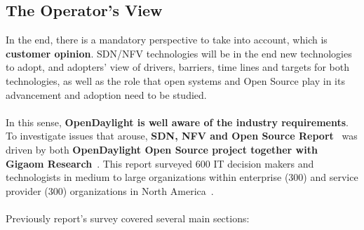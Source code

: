 \documentclass[a4paper, 12pt]{book}
\begin{document}
\subsection{The Operator's View}
In the end, there is a mandatory perspective to take into account, which is \textbf{customer opinion}. SDN/NFV technologies will be in the end new technologies to adopt, and adopters' view of drivers, barriers, time lines and targets for both technologies, as well as the role that open systems and Open Source play in its advancement and adoption need to be studied.\\
\\
In this sense, \textbf{OpenDaylight is well aware of the industry requirements}. To investigate issues that arouse, \textbf{SDN, NFV and Open Source Report}~\cite{SDNandNFVOperatorsView} was driven by both \textbf{OpenDaylight Open Source project together with Gigaom Research}~\cite{GigaomResearch}. This report surveyed 600 IT decision makers and technologists in medium to large organizations within enterprise (300) and service provider (300) organizations in North America~\cite{SDNandNFVOperatorsView}.\\
\\
Previously report's survey covered several main sections:
\end{document}
